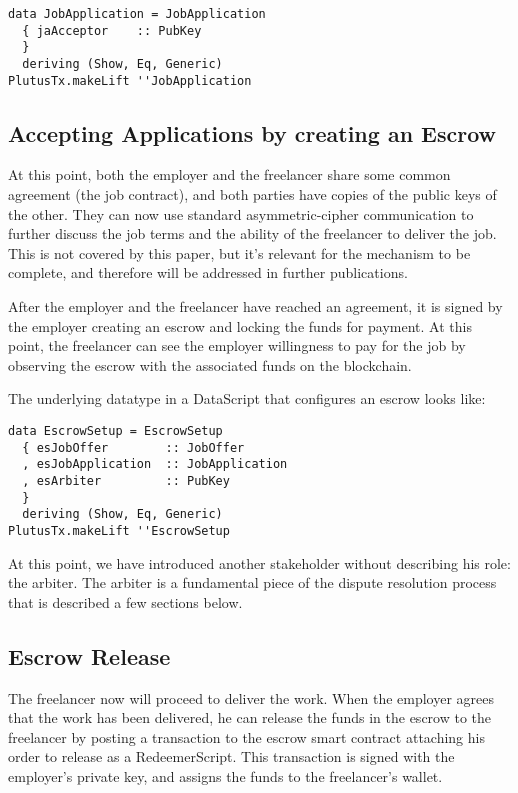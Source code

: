 \documentclass{article}
\begin{document}
\begin{samepage}
\begin{verbatim}
data JobApplication = JobApplication
  { jaAcceptor    :: PubKey
  }
  deriving (Show, Eq, Generic)
PlutusTx.makeLift ''JobApplication
\end{verbatim}
\end{samepage}

\subsection{Accepting Applications by creating an Escrow}
At this point, both the employer and the freelancer share some common agreement (the job contract), and both parties have copies of the public keys of the other. They can now use standard asymmetric-cipher communication to further discuss the job terms and the ability of the freelancer to deliver the job. This is not covered by this paper, but it's relevant for the mechanism to be complete, and therefore will be addressed in further publications.

After the employer and the freelancer have reached an agreement, it is signed by the employer creating an escrow and locking the funds for payment. At this point, the freelancer can see the employer willingness to pay for the job by observing the escrow with the associated funds on the blockchain.

The underlying datatype in a DataScript that configures an escrow looks like:

\begin{samepage}
\begin{verbatim}
data EscrowSetup = EscrowSetup
  { esJobOffer        :: JobOffer
  , esJobApplication  :: JobApplication
  , esArbiter         :: PubKey
  }
  deriving (Show, Eq, Generic)
PlutusTx.makeLift ''EscrowSetup
\end{verbatim}
\end{samepage}

At this point, we have introduced another stakeholder without describing his role: the arbiter. The arbiter is a fundamental piece of the dispute resolution process that is described a few sections below.

\subsection{Escrow Release}
The freelancer now will proceed to deliver the work. When the employer agrees that the work has been delivered, he can release the funds in the escrow to the freelancer by posting a transaction to the escrow smart contract attaching his order to release as a RedeemerScript. This transaction is signed with the employer's private key, and assigns the funds to the freelancer's wallet.
\end{document}

